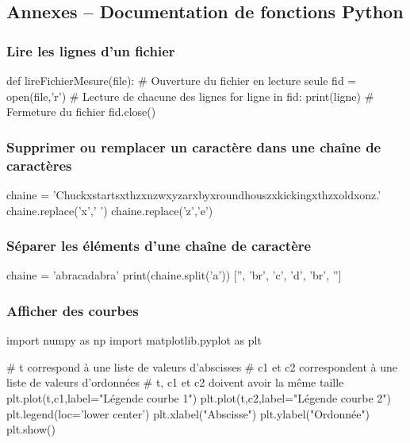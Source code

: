 \documentclass[10pt]{article}
\begin{document}
\subsection*{Annexes -- Documentation de fonctions Python}

\subsubsection*{Lire les lignes d'un fichier}
\begin{py}
\begin{python}
def lireFichierMesure(file):
    # Ouverture du fichier en lecture seule
    fid = open(file,'r')
    # Lecture de chacune des lignes
    for ligne in fid:
        print(ligne)
    # Fermeture du fichier        
    fid.close()
\end{python}
\end{py}


\subsubsection*{Supprimer ou remplacer un caractère dans une chaîne de caractères}
\begin{py}
\begin{python}
chaine = 'Chuckxstartsxthzxnzwxyzarxbyxroundhouszxkickingxthzxoldxonz.'
chaine.replace('x',' ')
chaine.replace('z','e')
\end{python}
\end{py}


\subsubsection*{Séparer les éléments d'une chaîne de caractère}
\begin{py}
\begin{python}
chaine = 'abracadabra'
print(chaine.split('a'))
    ['', 'br', 'c', 'd', 'br', '']
\end{python}
\end{py}

\subsubsection*{Afficher des courbes}
\begin{py}
\begin{python}
import numpy as np
import matplotlib.pyplot as plt

# t correspond à une liste de valeurs d'abscisses
# c1 et c2 correspondent à une liste de valeurs d'ordonnées
# t, c1 et c2 doivent avoir la même taille
plt.plot(t,c1,label="Légende courbe 1")
plt.plot(t,c2,label="Légende courbe 2")
plt.legend(loc='lower center')
plt.xlabel("Abscisse")
plt.ylabel("Ordonnée")
plt.show()

\end{python}
\end{py}
\end{document}
